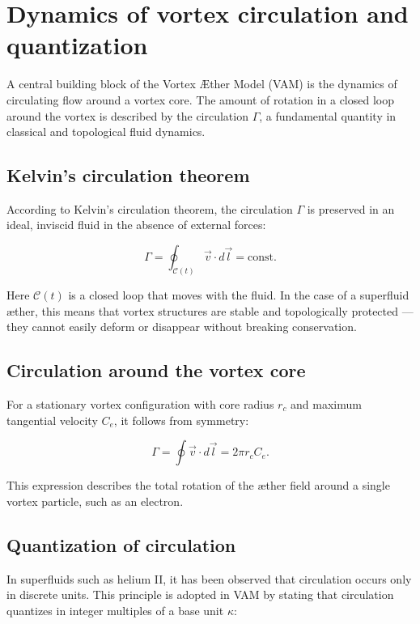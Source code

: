 \section{Dynamics of vortex circulation and quantization}

A central building block of the Vortex Æther Model (VAM) is the dynamics of circulating flow around a vortex core. The amount of rotation in a closed loop around the vortex is described by the circulation \( \Gamma \), a fundamental quantity in classical and topological fluid dynamics.

\subsection{Kelvin's circulation theorem}

According to Kelvin's circulation theorem, the circulation \( \Gamma \) is preserved in an ideal, inviscid fluid in the absence of external forces:

\begin{equation}
    \Gamma = \oint_{\mathcal{C}(t)} \vec{v} \cdot d\vec{l} = \text{const.}
\end{equation}

Here \( \mathcal{C}(t) \) is a closed loop that moves with the fluid. In the case of a superfluid æther, this means that vortex structures are stable and topologically protected — they cannot easily deform or disappear without breaking conservation.

\subsection{Circulation around the vortex core}

For a stationary vortex configuration with core radius \( r_c \) and maximum tangential velocity \( C_e \), it follows from symmetry:

\begin{equation}
    \Gamma = \oint \vec{v} \cdot d\vec{l} = 2\pi r_c C_e.
\end{equation}

This expression describes the total rotation of the æther field around a single vortex particle, such as an electron.

\subsection{Quantization of circulation}

In superfluids such as helium II, it has been observed that circulation occurs only in discrete units. This principle is adopted in VAM by stating that circulation quantizes in integer multiples of a base unit \( \kappa \):

